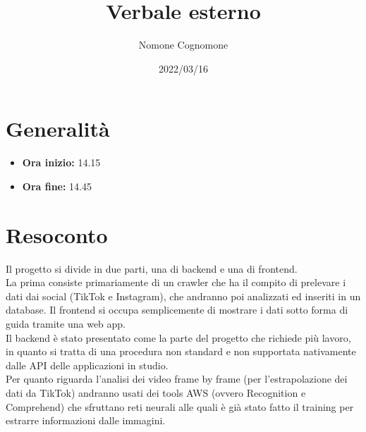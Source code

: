 \documentclass{classes/base}
\title{Verbale esterno}
\date{2022/03/16}
\author{Nomone Cognomone}
\renewcommand{\maketitle}{
    
}
\begin{document}
    \maketitle

    \section*{Generalità}
    \begin{itemize}
        \item \textbf{Ora inizio:} 14.15
        \item \textbf{Ora fine:} 14.45
    \end{itemize}

    \section*{Resoconto}
    Il progetto si divide in due parti, una di backend e una di frontend.\\
    La prima consiste primariamente di un crawler che ha il compito di prelevare i dati dai social (TikTok e Instagram), che andranno poi analizzati ed inseriti in un database.
    Il frontend si occupa semplicemente di mostrare i dati sotto forma di guida tramite una web app.\\
    Il backend è stato presentato come la parte del progetto che richiede più lavoro, in quanto si tratta di una procedura non standard e non supportata nativamente dalle API delle applicazioni in studio.\\
    Per quanto riguarda l'analisi dei video frame by frame (per l'estrapolazione dei dati da TikTok) andranno usati dei tools AWS (ovvero Recognition e Comprehend) che sfruttano reti neurali alle quali è già stato fatto il training per estrarre informazioni dalle immagini.
\end{document}
